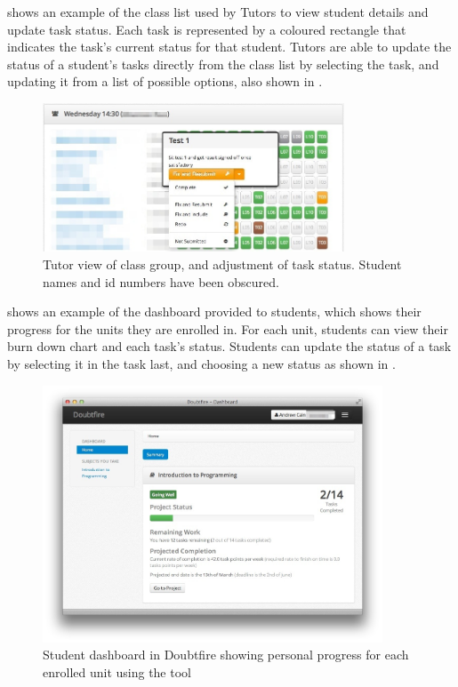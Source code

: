  shows an example of the class list used by Tutors to view student details and update task status. Each task is represented by a coloured rectangle that indicates the task's current status for that student. Tutors are able to update the status of a student's tasks directly from the class list by selecting the task, and updating it from a list of possible options, also shown in .

\begin{figure}[thbp]
  \centering
  \includegraphics[width=0.8\textwidth]{TutorView}
  \caption{Tutor view of class group, and adjustment of task status. Student names and id numbers have been obscured.}
  \label{fig:tutor_view}
\end{figure}

 shows an example of the dashboard provided to students, which shows their progress for the units they are enrolled in. For each unit, students can view their burn down chart and each task's status. Students can update the status of a task by selecting it in the task last, and choosing a new status as shown in .

\begin{figure}[thbp]
  \centering
  \includegraphics[width=0.9\textwidth]{HomePage}%
  \caption{Student dashboard in Doubtfire showing personal progress for each enrolled unit using the tool}%
  \label{fig:home_page}
\end{figure}

